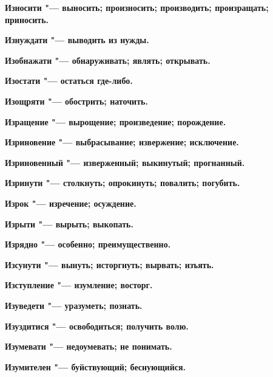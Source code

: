 \begin{mymulticols}{2}
\bfseries Износити\normalfont{} "--- выносить; произносить; производить; произращать; приносить. 




\bfseries Изнуждати\normalfont{} "--- выводить из нужды. 




\bfseries Изобнажати\normalfont{} "--- обнаруживать; являть; открывать. 




\bfseries Изостати\normalfont{} "--- остаться где-либо. 




\bfseries Изощряти\normalfont{} "--- обострить; наточить. 




\bfseries Изращение\normalfont{} "--- вырощение; произведение; порождение. 




\bfseries Изриновение\normalfont{} "--- выбрасывание; извержение; исключение. 




\bfseries Изриновенный\normalfont{} "--- изверженный; выкинутый; прогнанный. 




\bfseries Изринути\normalfont{} "--- столкнуть; опрокинуть; повалить; погубить. 




\bfseries Изрок\normalfont{} "--- изречение; осуждение. 




\bfseries Изрыти\normalfont{} "--- вырыть; выкопать. 




\bfseries Изрядно\normalfont{} "--- особенно; преимущественно. 




\bfseries Изсунути\normalfont{} "--- вынуть; исторгнуть; вырвать; изъять. 




\bfseries Изступление\normalfont{} "--- изумление; восторг. 




\bfseries Изуведети\normalfont{} "--- уразуметь; познать. 




\bfseries Изуздитися\normalfont{} "--- освободиться; получить волю. 




\bfseries Изумевати\normalfont{} "--- недоумевать; не понимать. 




\bfseries Изумителен\normalfont{} "--- буйствующий; беснующийся. 





\end{mymulticols}
